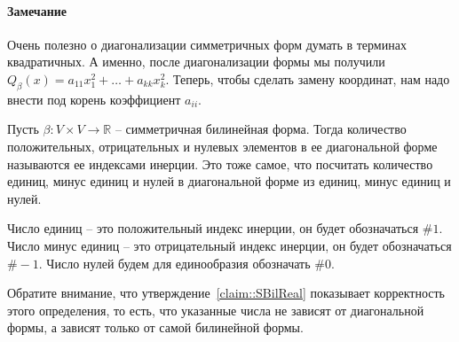 \paragraph{Замечание}

Очень полезно о диагонализации симметричных форм думать в терминах квадратичных.
А именно, после диагонализации формы мы получили $Q_\beta(x) = a_{11}x_1^2 + \ldots +a_{kk}x_k^2$.
Теперь, чтобы сделать замену координат, нам надо внести под корень коэффициент $a_{ii}$.

\begin{definition}
Пусть $\beta\colon V\times V\to \mathbb R$ -- симметричная билинейная форма.
Тогда количество положительных, отрицательных и нулевых элементов в ее диагональной форме называются ее индексами инерции.
Это тоже самое, что посчитать количество единиц, минус единиц и нулей в диагональной форме из единиц, минус единиц и нулей.

Число единиц -- это положительный индекс инерции, он будет обозначаться $\#1$.
Число минус единиц -- это отрицательный индекс инерции, он будет обозначаться $\#-1$.
Число нулей будем для единообразия обозначать $\#0$.
\end{definition}

Обратите внимание, что утверждение~\ref{claim::SBilReal} показывает корректность этого определения, то есть, что указанные числа не зависят от диагональной формы, а зависят только от самой билинейной формы.

